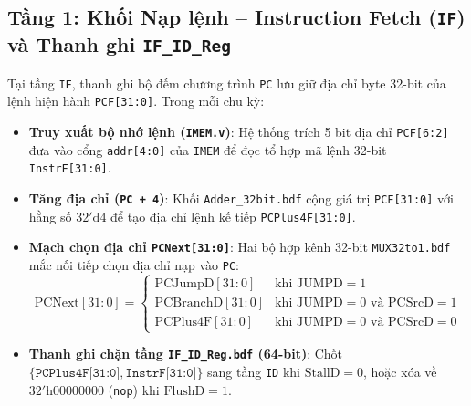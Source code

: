 \documentclass[12pt,a4paper]{report}
\begin{document}
\subsection{Tầng 1: Khối Nạp lệnh -- Instruction Fetch (\texttt{IF}) và Thanh ghi \texttt{IF\_ID\_Reg}}
Tại tầng \texttt{IF}, thanh ghi bộ đếm chương trình \texttt{PC} lưu giữ địa chỉ byte 32-bit của lệnh hiện hành \texttt{PCF[31:0]}. Trong mỗi chu kỳ:
\begin{itemize}
    \item \textbf{Truy xuất bộ nhớ lệnh (\texttt{IMEM.v})}: Hệ thống trích 5 bit địa chỉ \texttt{PCF[6:2]} đưa vào cổng \texttt{addr[4:0]} của \texttt{IMEM} để đọc tổ hợp mã lệnh 32-bit \texttt{InstrF[31:0]}.
    \item \textbf{Tăng địa chỉ (\texttt{PC + 4})}: Khối \texttt{Adder\_32bit.bdf} cộng giá trị \texttt{PCF[31:0]} với hằng số $32'\text{d}4$ để tạo địa chỉ lệnh kế tiếp \texttt{PCPlus4F[31:0]}.
    \item \textbf{Mạch chọn địa chỉ \texttt{PCNext[31:0]}}: Hai bộ hợp kênh 32-bit \texttt{MUX32to1.bdf} mắc nối tiếp chọn địa chỉ nạp vào \texttt{PC}:
    \begin{equation}
        \text{PCNext}[31:0] = \begin{cases}
            \text{PCJumpD}[31:0]   & \text{khi } \text{JUMPD} = 1 \\
            \text{PCBranchD}[31:0] & \text{khi } \text{JUMPD} = 0 \text{ và } \text{PCSrcD} = 1 \\
            \text{PCPlus4F}[31:0]  & \text{khi } \text{JUMPD} = 0 \text{ và } \text{PCSrcD} = 0
        \end{cases}
    \end{equation}
    \item \textbf{Thanh ghi chặn tầng \texttt{IF\_ID\_Reg.bdf} (64-bit)}: Chốt $\{\texttt{PCPlus4F[31:0]}, \texttt{InstrF[31:0]}\}$ sang tầng \texttt{ID} khi $\text{StallD} = 0$, hoặc xóa về $32'\text{h}00000000$ (\texttt{nop}) khi $\text{FlushD} = 1$.
\end{itemize}
\end{document}
